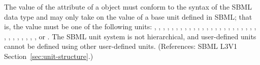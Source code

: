 The value of the attribute  of a \Unit object must conform to
the syntax of the SBML data type  and may only take on
the value of a base unit defined in SBML; that is, the value must be one of
the following units:
,
,
,
,
,
,
,
,
,
,
,
,
,
,
,
,
,
,
,
,
,
,
,
,
,
,
,
,
,
,
,
, or
.
The SBML unit system is not hierarchical, and user-defined units cannot be
defined using other user-defined units.  (References: SBML L3V1
Section~\ref{sec:unit-structure}.)
